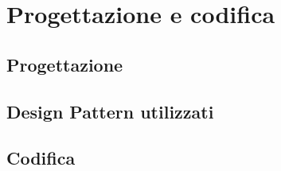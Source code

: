 \chapter{Progettazione e codifica}
\label{cap:progettazione-codifica}




%
%
%
%

\section{Progettazione}
\label{sec:progettazione}

%


\section{Design Pattern utilizzati}

\section{Codifica}
